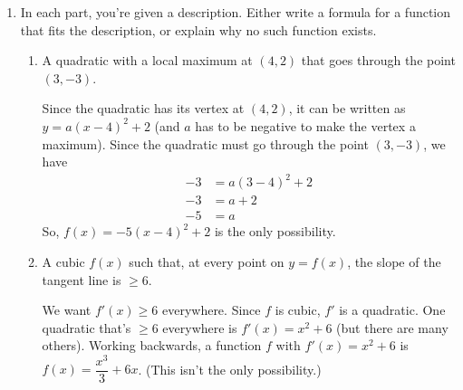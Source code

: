 \documentclass{article}
\newenvironment{noanswer}{}{}
\newcommand{\highlight}[1]{\boldmath\hl{\textbf{#1}}\unboldmath}
\theoremstyle{theorem}
\begin{document}
\begin{enumerate}
\begin{solution}
    \highlight{Global maximum:} Since $P(p)$ is a quadratic function that opens downward (because the coefficient of $p^2$ is negative), $p = 22$ must be the global maximum.

    So, you should charge  per shirt. 
  \end{solution}

\item \label{fall2018-final-practice3-10}  

  In each part, you're given a description. Either write a formula for a function that fits the description, or explain why no such function exists.

  \begin{enumerate}
  \item
    \begin{problem}[\vfill]
      A quadratic with a local maximum at $(4, 2)$ that goes through the point $(3, -3)$.
    \end{problem}

    \begin{solution}
      Since the quadratic has its vertex at $(4, 2)$, it can be written as $y = a (x - 4)^2 + 2$ (and $a$ has to be negative to make the vertex a maximum). Since the quadratic must go through the point $(3, -3)$, we have
      \begin{align*}
        -3 &= a (3 - 4)^2 + 2 \\
        -3 &= a + 2 \\
        -5 &= a
      \end{align*}
      So, $\boxed{f(x) = -5 (x - 4)^2 + 2}$ is the only possibility. 
    \end{solution}

  \item %

    \begin{problem}[\vfill\newpage]
      A cubic $f(x)$ such that, at every point on $y = f(x)$, the slope of the tangent line is $\geq 6$. 
    \end{problem}

    \begin{solution}
      \begin{noanswer}
        We want $f'(x) \geq 6$ everywhere. Since $f$ is cubic, $f'$ is a quadratic. One quadratic that's $\geq 6$ everywhere is $f'(x) = x^2 + 6$ (but there are many others). Working backwards, a function $f$ with $f'(x) = x^2 + 6$ is $\boxed{f(x) = \dfrac{x^3}{3} + 6x}$. (This isn't the only possibility.) 
      \end{noanswer}
    \end{solution}


\end{enumerate}
\end{enumerate}
\end{document}
